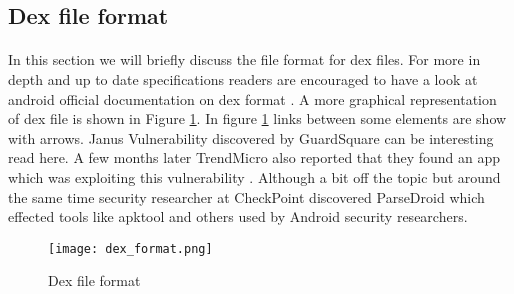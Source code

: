 \documentclass[../main.tex]{subfile}
\begin{document}
			\subsection{Dex file format}
				\paragraph{} In this section we will briefly discuss the file format for dex files. For more in depth and up to date specifications readers are encouraged to have a look at android official documentation on dex format \cite{dex_format}. A more graphical representation of dex file is shown in Figure \ref{fig:dex_format}. In figure \ref{fig:dex_format} links between some elements are show with arrows. Janus Vulnerability \cite{janus_vulnerability} discovered by GuardSquare can be interesting read here. A few months later TrendMicro also reported that they found an app which was exploiting this vulnerability \cite{janus_wild}. Although a bit off the topic but around the same time security researcher at CheckPoint discovered ParseDroid \cite{parsedroid} which effected tools like apktool and others used by Android security researchers.
				\begin{figure}
					\texttt{[image: dex\_format.png]}
					\caption{Dex file format \cite{dex_image_albertini}}
					\label{fig:dex_format}
				\end{figure}
				
\end{document}
